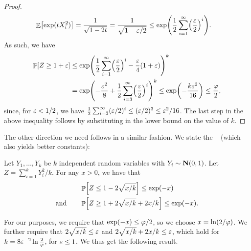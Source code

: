 \begin{proof}
    \begin{align*}
      \Ex{\exp( tX_i^2) }%
      &=%
        \frac{1}{\sqrt{1-2t}}%
        =%
        \frac{1}{\sqrt{1-\eps/2}}
      \leq
      \exp\pth{\frac{1}{2}\sum_{i=1}^\infty
      \pth{\frac{\eps}{2}}^{i}}.%
    \end{align*}
    As such, we have
    \begin{align*}
        \Prob{Z \geq 1+\eps}%
        &\leq%
        \exp\pth{\frac{1}{2}\sum_{i=1}^\infty
           \pth{\frac{\eps}{2}}^{i}
           -
           \frac{\eps}{4} \pth{1+\eps} }^k
        \\&
        =%
        \exp\pth{
           -\frac{\eps^2}{8} + 
           \frac{1}{2}\sum_{i=3}^\infty
           \pth{\frac{\eps}{2}}^{i}
        }^k
        \leq%
        \exp\pth{-\frac{k \eps^2}{16}}
        \leq %
        \frac{\BadProb}{2},
    \end{align*}
    since, for ${\varepsilon} < 1/2$, we have
    $\frac{1}{2}\sum_{i=3}^\infty ({\varepsilon}/ 2)^{i}\leq ({\varepsilon}/2)^3 \leq
    {{\varepsilon}^2}/{16}$. The last step in the above inequality follows by
    substituting in the lower bound on the value of $k$.
\end{proof}

The other direction we need follows in a similar fashion. We state the
~\cite[Lemma 1]{lm-aeqfm-00} (which also
yields better constants):

\begin{lemma}
    Let $Y_1, \ldots, Y_k$ be $k$ independent random variables with
    $Y_i \sim \NormalY{0}{1}$. Let $Z = \sum_{i=1}^k Y_i^2/k$. For any
    $x >0$, we have that
    \begin{align*}
        &\Prob{Z  \leq 1 -2 \sqrt{ x/k}} \leq \exp(-x)%
        \\
        \text{and}\qquad&
        \Prob{Z  \geq 1 + 2 \sqrt{ x/k} + 2x/k} \leq \exp(-x).%
    \end{align*}   
\end{lemma}

For our purposes, we require that $\exp(-x) \leq \varphi/2$, so
we choose $x = \ln(2/\varphi)$. We further require that
$2 \sqrt{ x/k} \leq {\varepsilon}$ and $2 \sqrt{ x/k} + 2x/k \leq {\varepsilon}$, which
hold for $k = 8{\varepsilon}^{-2} \ln \frac{2}{\varphi}$, for ${\varepsilon} \leq 1$.
We thus get the following result.

